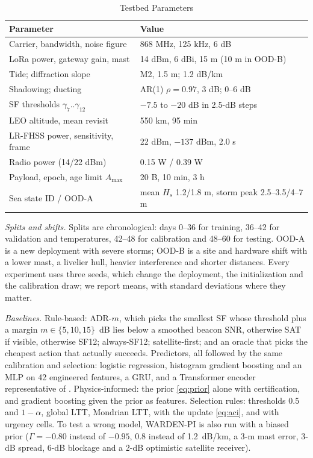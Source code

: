 \documentclass[journal]{IEEEtran}\def\WARDENieee{1}%
\newcommand{\Hs}{H_s}
\begin{document}
\begin{table}[!t]
\caption{Testbed Parameters}\label{tab:param}
\centering\scriptsize\setlength{\tabcolsep}{3pt}
\begin{tabular}{@{}ll@{}}
\toprule
Parameter & Value\\\midrule
Carrier, bandwidth, noise figure & 868 MHz, 125 kHz, 6 dB\\
LoRa power, gateway gain, mast & 14 dBm, 6 dBi, 15 m (10 m in OOD-B)\\
Tide; diffraction slope & M2, 1.5 m; 1.2 dB/km\\
Shadowing; ducting & AR(1) $\rho{=}0.97$, 3 dB; 0--6 dB\\
SF thresholds $\gamma_7..\gamma_{12}$ & $-7.5$ to $-20$ dB in 2.5-dB steps\\
LEO altitude, mean revisit & 550 km, 95 min\\
LR-FHSS power, sensitivity, frame & 22 dBm, $-137$ dBm, 2.0 s\\
Radio power (14/22 dBm) & 0.15 W / 0.39 W\\
Payload, epoch, age limit $A_{\max}$ & 20 B, 10 min, 3 h\\
Sea state ID / OOD-A & mean $\Hs$ 1.2/1.8 m, storm peak 2.5--3.5/4--7 m\\
\bottomrule
\end{tabular}
\end{table}

\emph{Splits and shifts.} Splits are chronological: days 0--36 for training, 36--42 for validation and temperatures, 42--48 for calibration and 48--60 for testing. OOD-A is a new deployment with severe storms; OOD-B is a site and hardware shift with a lower mast, a livelier hull, heavier interference and shorter distances. Every experiment uses three seeds, which change the deployment, the initialization and the calibration draw; we report means, with standard deviations where they matter.

\emph{Baselines.} Rule-based: ADR-$m$, which picks the smallest SF whose threshold plus a margin $m\in\{5,10,15\}$~dB lies below a smoothed beacon SNR, otherwise SAT if visible, otherwise SF12; always-SF12; satellite-first; and an oracle that picks the cheapest action that actually succeeds. Predictors, all followed by the same calibration and selection: logistic regression, histogram gradient boosting and an MLP on 42 engineered features, a GRU, and a Transformer encoder representative of \cite{b20,b21,b22}. Physics-informed: the prior \eqref{eq:prior} alone with certification, and gradient boosting given the prior as features. Selection rules: thresholds 0.5 and $1-\alpha$, global LTT, Mondrian LTT, with the update \eqref{eq:aci}, and with urgency cells. To test a wrong model, WARDEN-PI is also run with a biased prior ($\Gamma=-0.80$ instead of $-0.95$, 0.8 instead of 1.2~dB/km, a 3-m mast error, 3-dB spread, 6-dB blockage and a 2-dB optimistic satellite receiver).
\end{document}
